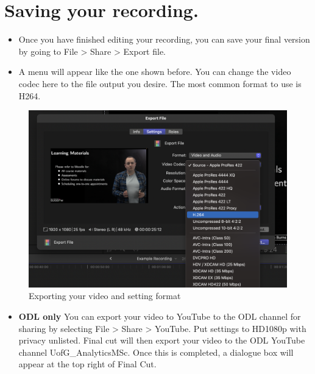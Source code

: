 \documentclass[
]{book}
\providecommand{\tightlist}{%
  \setlength{\itemsep}{0pt}\setlength{\parskip}{0pt}}
\begin{document}
\hypertarget{saving-your-recording.}{%
\section{Saving your recording.}\label{saving-your-recording.}}

\begin{itemize}
\item
  Once you have finished editing your recording, you can save your final version by going to File \textgreater{} Share \textgreater{} Export file.
\item
  A menu will appear like the one shown before. You can change the video codec here to the file output you desire. The most common format to use is H264.
\end{itemize}

\begin{figure}

{\centering \includegraphics[width=1\linewidth]{Saving} 

}

\caption{Exporting your video and setting format}\label{fig:saving}
\end{figure}

\begin{itemize}
\tightlist
\item
  \textbf{ODL only} You can export your video to YouTube to the ODL channel for sharing by selecting File \textgreater{} Share \textgreater{} YouTube. Put settings to HD1080p with privacy unlisted. Final cut will then export your video to the ODL YouTube channel UofG\_AnalyticsMSc. Once this is completed, a dialogue box will appear at the top right of Final Cut.
\end{itemize}
\end{document}
